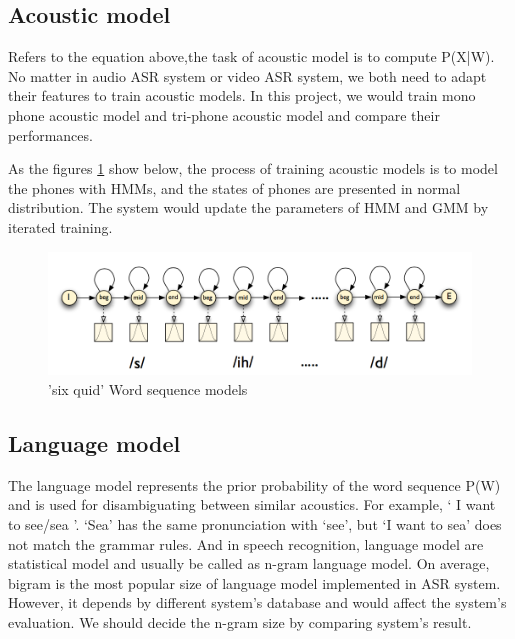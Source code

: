 \subsection{Acoustic model}    
Refers to the equation above,the task of acoustic model is to compute P(X|W). No matter in audio ASR system or video ASR system, we both need to adapt their features to train acoustic models. In this project, we would train mono phone acoustic model and tri-phone acoustic model and compare their performances. 

As the figures \ref{fig:wsm} show below, the process of training acoustic models is to model the phones with HMMs, and the states of phones are presented in normal distribution. The system would update the parameters of HMM and GMM by iterated training.
        
\begin{figure}[ht]
\centering
\includegraphics[width=1\linewidth]{figures/wsm.png}
\caption{'six quid' Word sequence models}
\label{fig:wsm}
\end{figure}

\subsection{Language model}
The language model represents the prior probability of the word sequence P(W) and is used for disambiguating between similar acoustics. For example, ‘ I want to see/sea ’. ‘Sea’ has the same pronunciation with ‘see’, but ‘I want to sea’ does not match the grammar rules.
And in speech recognition, language model are statistical model and usually be called as n-gram language model. On average, bigram is the most popular size of language model implemented in ASR system. However, it depends by different system’s database and would affect the system’s evaluation. We should decide the n-gram size by comparing system’s result. 

